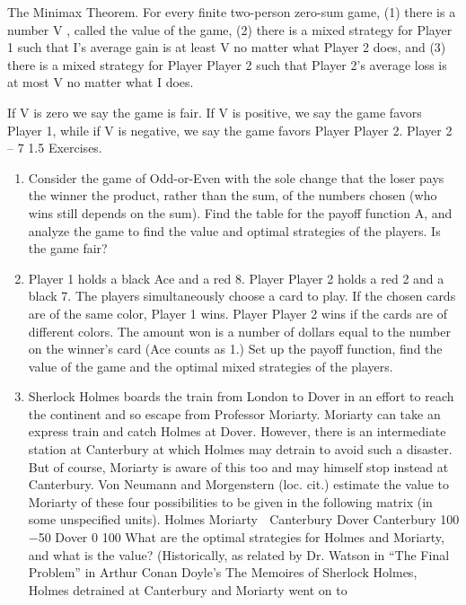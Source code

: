 \begin{framed}
The Minimax Theorem. For every finite two-person zero-sum game,
(1) there is a number V , called the value of the game,
(2) there is a mixed strategy for Player 1 such that I’s average gain is at least V no
matter what Player 2 does, and
(3) there is a mixed strategy for Player Player 2 such that Player 2’s average loss is at most V no
matter what I does.
\end{framed}
If V is zero we say the game is fair. If V is positive, we say the game
favors Player 1, while if V is negative, we say the game favors Player Player 2.
Player 2 – 7
1.5 Exercises.
\begin{enumerate}
\item Consider the game of Odd-or-Even with the sole change that the loser pays the
winner the product, rather than the sum, of the numbers chosen (who wins still depends
on the sum). Find the table for the payoff function A, and analyze the game to find the
value and optimal strategies of the players. Is the game fair?
\item  Player 1 holds a black Ace and a red 8. Player Player 2 holds a red 2 and a black 7. The
players simultaneously choose a card to play. If the chosen cards are of the same color,
Player 1 wins. Player Player 2 wins if the cards are of different colors. The amount won is a
number of dollars equal to the number on the winner’s card (Ace counts as 1.) Set up the
payoff function, find the value of the game and the optimal mixed strategies of the players.
\item  Sherlock Holmes boards the train from London to Dover in an effort to reach the
continent and so escape from Professor Moriarty. Moriarty can take an express train and
catch Holmes at Dover. However, there is an intermediate station at Canterbury at which
Holmes may detrain to avoid such a disaster. But of course, Moriarty is aware of this too
and may himself stop instead at Canterbury. Von Neumann and Morgenstern (loc. cit.)
estimate the value to Moriarty of these four possibilities to be given in the following matrix
(in some unspecified units).
Holmes
Moriarty 
Canterbury Dover
Canterbury 100 −50
Dover 0 100
What are the optimal strategies for Holmes and Moriarty, and what is the value? (Historically,
as related by Dr. Watson in “The Final Problem” in Arthur Conan Doyle’s The
Memoires of Sherlock Holmes, Holmes detrained at Canterbury and Moriarty went on to

\end{enumerate}
